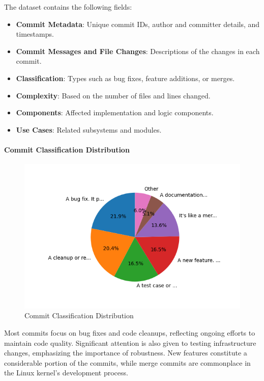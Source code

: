 The dataset contains the following fields:

\begin{itemize}
    \item \textbf{Commit Metadata}: Unique commit IDs, author and committer details, and timestamps.
    \item \textbf{Commit Messages and File Changes}: Descriptions of the changes in each commit.
    \item \textbf{Classification}: Types such as bug fixes, feature additions, or merges.
    \item \textbf{Complexity}: Based on the number of files and lines changed.
    \item \textbf{Components}: Affected implementation and logic components.
    \item \textbf{Use Cases}: Related subsystems and modules.
\end{itemize}

% 
% 

\paragraph{Commit Classification Distribution}

\begin{figure}[ht]
    \centering
    \includegraphics[width=\linewidth]{feature-analysis/commit_pie_chart_commit_classification.png}
    \caption{Commit Classification Distribution}
    \label{fig:commit_pie_chart_commit_classification}
\end{figure}

Most commits focus on bug fixes and code cleanups, reflecting ongoing efforts to maintain code quality. Significant attention is also given to testing infrastructure changes, emphasizing the importance of robustness. New features constitute a considerable portion of the commits, while merge commits are commonplace in the Linux kernel's development process.

